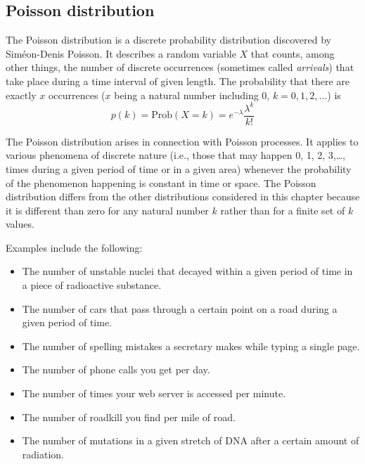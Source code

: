 \documentclass[justified,sixbynine]{tufte-book}
\theoremstyle{plain}%
\theoremstyle{definition}
\theoremstyle{remark}
\begin{document}
\begin{fullwidth}
\goodbreak\subsection{Poisson distribution}


The Poisson distribution is a discrete probability distribution discovered
by Sim\'{e}on-Denis Poisson. It describes a random variable
$X$ that counts, among other things, the number of
discrete occurrences (sometimes called {\it arrivals}) that take place during
a time interval of given length. The probability that there are exactly $x$
occurrences ($x$ being a natural number including 0, $k=0,1,2,\dots$) is
\begin{equation}
p(k)=\textrm{Prob}(X=k)=e^{-\lambda }\frac{\lambda ^k}{k!}
\end{equation}

The Poisson distribution arises in connection with Poisson processes. It
applies to various phenomena of discrete nature (i.e., those that may
happen 0, 1, 2, 3,\dots, times during a given period of time or in a given
area) whenever the probability of the phenomenon happening is constant in
time or space. The Poisson distribution differs from the other distributions
considered in this chapter because it is different than zero for any natural
number $k$ rather than for a finite set of $k$ values.

Examples include the following:

\begin{itemize}
\item  The number of unstable nuclei that decayed within a given period of
time in a piece of radioactive substance.

\item  The number of cars that pass through a certain point on a road during
a given period of time.

\item  The number of spelling mistakes a secretary makes while typing a
single page.

\item  The number of phone calls you get per day.

\item  The number of times your web server is accessed per minute.

\item  The number of roadkill you find per mile of road.

\item  The number of mutations in a given stretch of DNA after a certain
amount of radiation.


\end{itemize}
\end{fullwidth}
\end{document}
